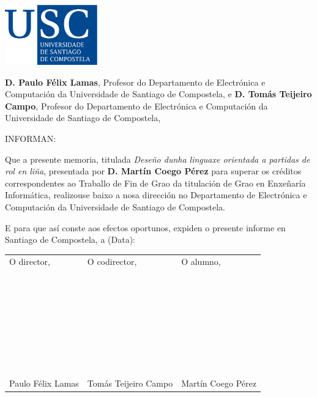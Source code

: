 \pagestyle{plain}
\includegraphics[width=4cm]{figuras/logo_usc.eps}

\vspace{1cm}
{\bf D. Paulo Félix Lamas}, Profesor do Departamento de Electrónica e
Computación da Universidade de Santiago de Compostela, e {\bf D. Tomás Teijeiro
Campo}, Profesor do Departamento de Electrónica e Computación da Universidade de
Santiago de Compostela,

\vspace{1cm}
INFORMAN:

\vspace{1cm}
Que a presente memoria, titulada {\it Deseño dunha linguaxe orientada a partidas
de rol en liña}, presentada por {\bf D.
Martín Coego Pérez} para superar os créditos correspondentes ao
Traballo de Fin de Grao da titulación de Grao en Enxeñaría Informática,
realizouse baixo a nosa dirección no Departamento de Electrónica e Computación
da Universidade de Santiago de Compostela.

\vspace{1cm}
E para que así conste aos efectos oportunos, expiden o presente informe en
Santiago de Compostela, a (Data):

\vspace{2cm}
\begin{tabular}{lll}
O director, & O codirector, & O alumno, \\
~ \\
~ \\
~ \\
~ \\
~ \\
~ \\
~ \\
Paulo Félix Lamas & Tomás Teijeiro Campo & Martín Coego Pérez
\end{tabular}


